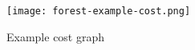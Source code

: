 \begin{figure}[H]
    \centering
    \texttt{[image: forest-example-cost.png]}
    \caption{Example cost graph}\label{fig:forest_cost_graph}
\end{figure}